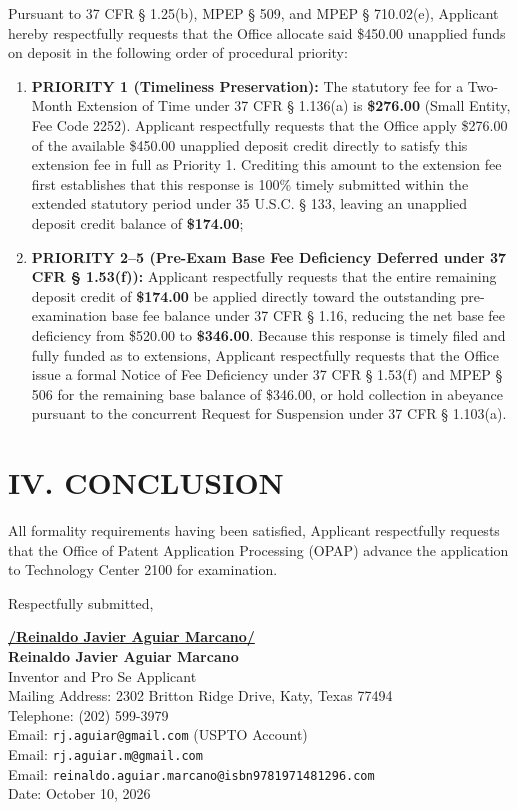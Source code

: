 \documentclass[11pt,letterpaper]{article}
\begin{document}
Pursuant to 37 CFR \S{} 1.25(b), MPEP \S{} 509, and MPEP \S{} 710.02(e), Applicant hereby respectfully requests that the Office allocate said \$450.00 unapplied funds on deposit in the following order of procedural priority:
\begin{enumerate}[leftmargin=*]
    \item \textbf{PRIORITY 1 (Timeliness Preservation):} The statutory fee for a Two-Month Extension of Time under 37 CFR \S{} 1.136(a) is \textbf{\$276.00} (Small Entity, Fee Code 2252). Applicant respectfully requests that the Office apply \$276.00 of the available \$450.00 unapplied deposit credit directly to satisfy this extension fee in full as Priority 1. Crediting this amount to the extension fee first establishes that this response is 100\% timely submitted within the extended statutory period under 35 U.S.C. \S{} 133, leaving an unapplied deposit credit balance of \textbf{\$174.00};
    \item \textbf{PRIORITY 2--5 (Pre-Exam Base Fee Deficiency Deferred under 37 CFR \S{} 1.53(f)):} Applicant respectfully requests that the entire remaining deposit credit of \textbf{\$174.00} be applied directly toward the outstanding pre-examination base fee balance under 37 CFR \S{} 1.16, reducing the net base fee deficiency from \$520.00 to \textbf{\$346.00}. Because this response is timely filed and fully funded as to extensions, Applicant respectfully requests that the Office issue a formal Notice of Fee Deficiency under 37 CFR \S{} 1.53(f) and MPEP \S{} 506 for the remaining base balance of \$346.00, or hold collection in abeyance pursuant to the concurrent Request for Suspension under 37 CFR \S{} 1.103(a).
\end{enumerate}

\section*{IV. CONCLUSION}

All formality requirements having been satisfied, Applicant respectfully requests that the Office of Patent Application Processing (OPAP) advance the application to Technology Center 2100 for examination.

\vspace{0.6cm}
\begin{singlespace}
\noindent Respectfully submitted, \par\vspace{0.8cm}
\underline{\textbf{/Reinaldo Javier Aguiar Marcano/}} \\
\textbf{Reinaldo Javier Aguiar Marcano} \\
Inventor and Pro Se Applicant \\
Mailing Address: 2302 Britton Ridge Drive, Katy, Texas 77494 \\
Telephone: (202) 599-3979 \\
Email: \texttt{rj.aguiar@gmail.com} (USPTO Account) \\
Email: \texttt{rj.aguiar.m@gmail.com} \\
Email: \texttt{reinaldo.aguiar.marcano@isbn9781971481296.com} \\
Date: October 10, 2026
\end{singlespace}
\end{document}
